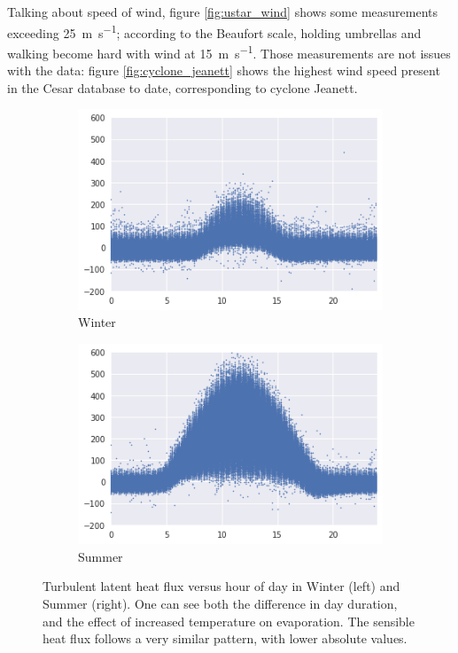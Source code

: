 \documentclass[a4paper]{book}
\begin{document}
Talking about speed of wind, figure \ref{fig:ustar_wind} shows some measurements exceeding \SI{25}{\meter\per\second}; according to the Beaufort scale, holding umbrellas and walking become hard with wind at \SI{15}{\meter\per\second}. Those measurements are not issues with the data: figure \ref{fig:cyclone_jeanett} shows the highest wind speed present in the Cesar database to date, corresponding to cyclone Jeanett.

\begin{figure}
    \centering
    \begin{subfigure}[t]{0.48\textwidth}
        \centering
        \includegraphics[width=\textwidth]{images/le_winter}
        \caption{Winter}
        \label{fig:le_winter}
    \end{subfigure}
    \hfill
    \begin{subfigure}[t]{0.48\textwidth}
        \centering
        \includegraphics[width=\textwidth]{images/le_summer}
        \caption{Summer}
        \label{fig:le_summer}
    \end{subfigure}
    \caption{Turbulent latent heat flux versus hour of day in Winter (left) and Summer (right). One can see both the difference in day duration, and the effect of increased temperature on evaporation. The sensible heat flux follows a very similar pattern, with lower absolute values.}
	\label{fig:le_season}
\end{figure}
\end{document}

